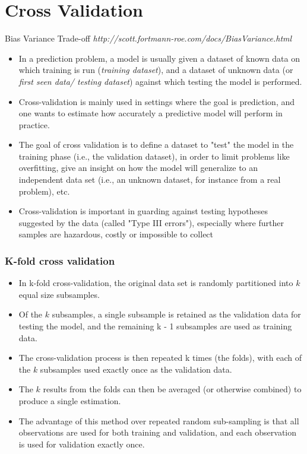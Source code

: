 \documentclass[caret-main.tex]{subfiles}
\begin{document}
\newpage
\section{Cross Validation}
Bias Variance Trade-off \textit{http://scott.fortmann-roe.com/docs/BiasVariance.html}
\begin{itemize}
\item In a prediction problem, a model is usually given a dataset of known data 
on which training is run (\textit{training dataset}), and a dataset of unknown data (or \textit{first seen data/ testing dataset}) against which testing the model is performed.
\item Cross-validation is mainly used in settings where the goal is prediction, and one wants to estimate how accurately a predictive model will perform in practice. 
\item The goal of cross validation is to define a dataset to "test" the model in the training phase (i.e., the validation dataset), in order to limit problems like overfitting, give an insight on how the model will generalize to an independent data set (i.e., an unknown dataset, for instance from a real problem), etc.
\item Cross-validation is important in guarding against testing hypotheses suggested by the data (called "Type III errors"), especially where further samples 
are hazardous, costly or impossible to collect 
\end{itemize}
\subsubsection{K-fold cross validation}
\begin{itemize}
\item In k-fold cross-validation, the original data set is randomly partitioned into $k$ equal size subsamples. 
\item Of the $k$ subsamples, a single subsample is retained as the validation data for testing the model, and the remaining k - 1 subsamples are used as training data. 
\item The cross-validation process is then repeated k times (the folds), with each of the $k$ subsamples used exactly once as the validation data. \item The $k$ results from the folds can then be averaged (or otherwise combined) to produce a single estimation.
\item The advantage of this method over repeated random sub-sampling is that all observations are used for both training and validation, and each observation is used for validation exactly once. 
\end{itemize}
\end{document}
